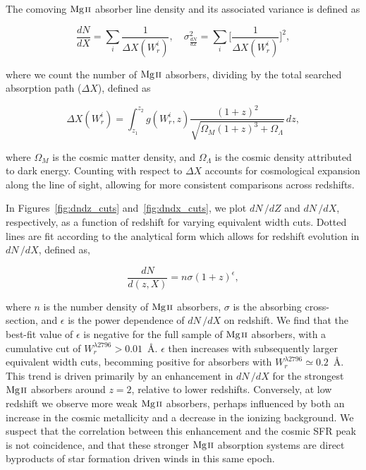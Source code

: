 \documentclass[iop,apj,numberedappendix,appendixfloats,twocolappendix]{emulateapj}
\begin{document}
The comoving ${\hbox{{\rm Mg}\kern 0.1em{\sc ii}}}$ absorber line density and its associated variance is defined as

\begin{equation}
\frac{d N}{d X} = \sum_{i}\frac{1}{\Delta X(W_r^i)},\quad \sigma^2_{\frac{d N}{d Z}} = \sum_{i} \Big[\frac{1}{\Delta X(W_r^i)}\Big]^2,
\label{eqn:dndx}
\end{equation}

where we count the number of ${\hbox{{\rm Mg}\kern 0.1em{\sc ii}}}$ absorbers, dividing by the total searched absorption path ($\Delta X$), defined as

\begin{equation}
\Delta X(W_r^i) = \int_{z_1}^{z_2} g(W_r^i, z) \frac{(1 + z)^2}{\sqrt{\Omega_M (1 + z)^3 + \Omega_{\Lambda}}}\,dz,
\label{eqn:deltax}
\end{equation}

where $\Omega_M$ is the cosmic matter density, and $\Omega_{\Lambda}$ is the cosmic density attributed to dark energy. Counting with respect to $\Delta X$ accounts for cosmological expansion along the line of sight, allowing for more consistent comparisons across redshifts. 

In Figures~\ref{fig:dndz_cuts} and~\ref{fig:dndx_cuts}, we plot $dN\,/dZ$ and $dN\,/dX$, respectively, as a function of redshift for varying equivalent width cuts. Dotted lines are fit according to the analytical form which allows for redshift evolution in $dN\,/dX$, defined as,

\begin{equation}
\frac{dN}{d(z,X)} = n\sigma (1 + z)^{\epsilon},
\label{eqn:dndxfit}
\end{equation}

where $n$ is the number density of ${\hbox{{\rm Mg}\kern 0.1em{\sc ii}}}$ absorbers, $\sigma$ is the absorbing cross-section, and $\epsilon$ is the power dependence of $dN\,/dX$ on redshift. We find that the best-fit value of $\epsilon$ is negative for the full sample of ${\hbox{{\rm Mg}\kern 0.1em{\sc ii}}}$ absorbers, with a cumulative cut of $W_r^{\lambda2796} > 0.01$~{\AA}. $\epsilon$ then increases with subsequently larger equivalent width cuts, becomming positive for absorbers with $W_r^{\lambda2796} \simeq 0.2$~{\AA}. This trend is driven primarily by an enhancement in $dN\,/dX$ for the strongest ${\hbox{{\rm Mg}\kern 0.1em{\sc ii}}}$ absorbers around $z = 2$, relative to lower redshifts. Conversely, at low redshift we observe more weak ${\hbox{{\rm Mg}\kern 0.1em{\sc ii}}}$ absorbers, perhaps influenced by both an increase in the cosmic metallicity and a decrease in the ionizing background. We suspect that the correlation between this enhancement and the cosmic SFR peak is not coincidence, and that these stronger ${\hbox{{\rm Mg}\kern 0.1em{\sc ii}}}$ absorption systems are direct byproducts of star formation driven winds in this same epoch. 
\end{document}
